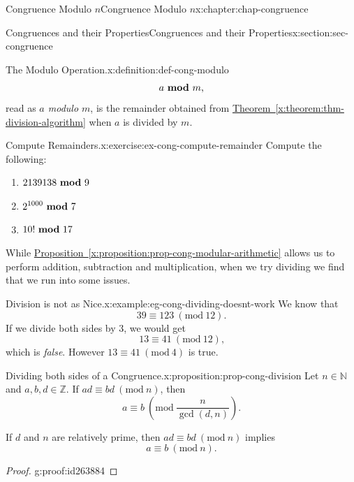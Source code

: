 \documentclass[oneside,10pt,]{book}
\newcommand{\xreffont}{\relax}
\numberwithin{equation}{section}
\newcommand{\Mod}[1]{\ \left(\mathrm{mod}\ #1\right)}
\newcommand{\mmod}[1]{\ \mathrm{\bf mod}\ #1}
\begin{document}
\begin{chapterptx}{Congruence Modulo \(n\)}{}{Congruence Modulo \(n\)}{}{}{x:chapter:chap-congruence}
\begin{sectionptx}{Congruences and their Properties}{}{Congruences and their Properties}{}{}{x:section:sec-congruence}
\begin{definition}{The Modulo Operation.}{x:definition:def-cong-modulo}
\begin{equation*}
a \mmod{m}\text{,}
\end{equation*}
read as \emph{\(a\) modulo \(m\)}, is the remainder obtained from \hyperref[x:theorem:thm-division-algorithm]{Theorem~{\xreffont\ref{x:theorem:thm-division-algorithm}}} when \(a\) is divided by \(m\). \label{g:notation:id239132}%
\end{definition}
\begin{inlineexercise}{Compute Remainders.}{x:exercise:ex-cong-compute-remainder}%
Compute the following:%
\begin{enumerate}[label=(\alph*)]
\item{}\(\displaystyle 2139138 \mmod 9\)%
\item{}\(\displaystyle 2^{1000} \mmod 7\)%
\item{}\(\displaystyle 10! \mmod 17\)%
\end{enumerate}
%
\end{inlineexercise}
While \hyperref[x:proposition:prop-cong-modular-arithmetic]{Proposition~{\xreffont\ref{x:proposition:prop-cong-modular-arithmetic}}} allows us to perform addition, subtraction and multiplication, when we try dividing we find that we run into some issues.%
\begin{example}{Division is not as Nice.}{x:example:eg-cong-dividing-doesnt-work}%
We know that%
\begin{equation*}
39 \equiv 123 \Mod{12}\text{.}
\end{equation*}
If we divide both sides by 3, we would get%
\begin{equation*}
13 \equiv 41 \Mod{12}\text{,}
\end{equation*}
which is \emph{false}. However \(13 \equiv 41 \Mod{4}\) is true.%
\end{example}
\begin{proposition}{Dividing both sides of a Congruence.}{}{x:proposition:prop-cong-division}%
Let \(n \in \mathbb{N}\) and \(a,b,d \in \mathbb{Z}\). If \(ad \equiv bd \Mod{n}\), then%
\begin{equation*}
a \equiv b \Mod{\dfrac{n}{\gcd(d,n)}}\text{.}
\end{equation*}
%
\par
If \(d\) and \(n\) are relatively prime, then \(ad \equiv bd \Mod{n}\) implies%
\begin{equation*}
a \equiv b \Mod{n}\text{.}
\end{equation*}
%
\end{proposition}
\begin{proof}{}{g:proof:id263884}

\end{proof}
\end{sectionptx}
\end{chapterptx}
\end{document}
